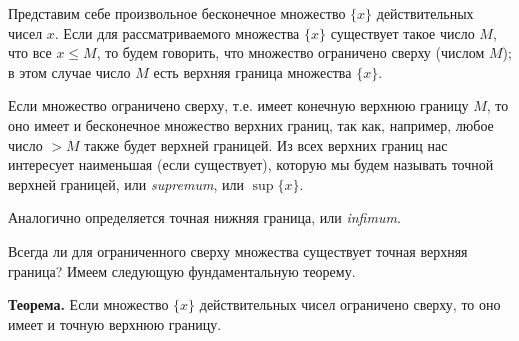 \begin{rusblock}
Представим себе произвольное бесконечное множество $\{x\}$ действительных чисел $x$. Если для рассматриваемого множества $\{x\}$ существует такое число $M$, что все $x\le M$, то будем говорить, что множество ограничено сверху (числом $M$); в этом случае число $M$ есть верхняя граница множества $\{x\}$.

Если множество ограничено сверху, т.е. имеет конечную верхнюю границу $M$, то оно имеет и бесконечное множество верхних границ, так как, например, любое число $>M$ также будет верхней границей. Из всех верхних границ нас интересует наименьшая (если существует), которую мы будем называть точной верхней границей, или \emph{supremum}, или $\sup\{x\}$.

Аналогично определяется точная нижняя граница, или \emph{infimum}.
\end{rusblock}

\begin{rusblock}
Всегда ли для ограниченного сверху множества существует точная верхняя граница? Имеем следующую фундаментальную теорему.

\textbf{Теорема.} Если множество $\{x\}$ действительных чисел ограничено сверху, то оно имеет и точную верхнюю границу.
\end{rusblock}

